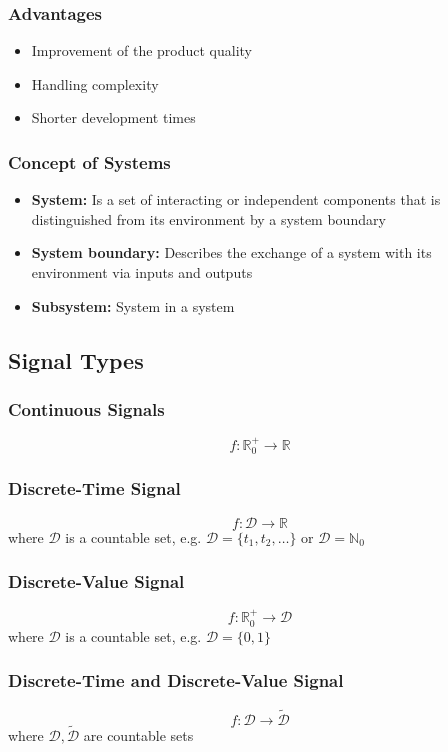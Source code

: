 \documentclass[10pt,a4paper]{article}
\begin{document}
\subsubsection{Advantages}
\begin{itemize}
	\item Improvement of the product quality
	\item Handling complexity
	\item Shorter development times
\end{itemize}

\subsubsection{Concept of Systems}
\begin{itemize}
	\item \textbf{System:} Is a set of interacting or independent components that is distinguished from its environment by a system boundary
	\item \textbf{System boundary:} Describes the exchange of a system with its environment via inputs and outputs
	\item \textbf{Subsystem:} System in a system
\end{itemize}

\subsection{Signal Types}
\subsubsection{Continuous Signals}
$$
	f : \mathbb{R}^+_0 → \mathbb{R}
$$

\subsubsection{Discrete-Time Signal}
$$
	f : \mathcal D → \mathbb{R}
$$ where $\mathcal D$ is a countable set, e.g. $\mathcal D = \{t_1, t_2, \dots \} \text{ or } \mathcal D = \mathbb{N}_0$

\subsubsection{Discrete-Value Signal}
$$
	f : \mathbb{R}^+_0 → \mathcal D
$$ where $\mathcal D$ is a countable set, e.g. $\mathcal D  = \{0, 1\}$

\subsubsection{Discrete-Time and Discrete-Value Signal}
$$
	f : \mathcal D → \tilde{\mathcal D}
$$ where $\mathcal D, \tilde{\mathcal D}$ are countable sets
\end{document}
